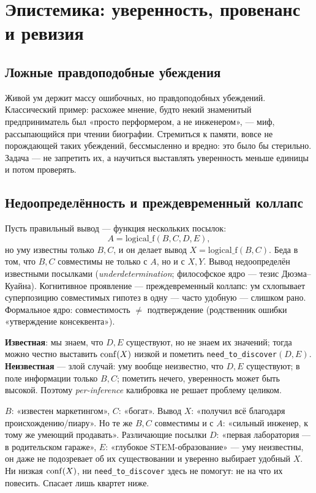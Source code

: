 \chapter{Эпистемика: уверенность, провенанс и ревизия}
\label{ch:epistemics}

\section{Ложные правдоподобные убеждения}

Живой ум держит массу ошибочных, но правдоподобных убеждений. Классический
пример: расхожее мнение, будто некий знаменитый предприниматель был «просто
перформером, а не инженером», --- миф, рассыпающийся при чтении биографии.
Стремиться к памяти, вовсе не порождающей таких убеждений, бессмысленно и
вредно: это было бы стерильно. Задача --- не запретить их, а научиться
выставлять уверенность меньше единицы и потом проверять.

\section{Недоопределённость и преждевременный коллапс}

Пусть правильный вывод --- функция нескольких посылок:
\[
A = \mathrm{logical\_f}(B, C, D, E),
\]
но уму известны только $B, C$, и он делает вывод
$X = \mathrm{logical\_f}(B, C)$. Беда в том, что $B, C$ совместимы не только с
$A$, но и с $X, Y$. Вывод недоопределён известными посылками
(\textit{underdetermination}; философское ядро --- тезис Дюэма--Куайна).
Когнитивное проявление --- преждевременный коллапс: ум схлопывает
суперпозицию совместимых гипотез в одну --- часто удобную --- слишком рано.
Формальное ядро: совместимость $\ne$ подтверждение (родственник ошибки
«утверждение консеквента»).

\begin{pitfall}
\textbf{Известная}: мы знаем, что $D, E$ существуют, но не знаем их значений;
тогда можно честно выставить $\mathrm{conf}(X)$ низкой и пометить
\texttt{need\_to\_discover}$(D, E)$. \textbf{Неизвестная} --- злой случай:
уму вообще неизвестно, что $D, E$ существуют; в поле информации только
$B, C$; пометить нечего, уверенность может быть высокой. Поэтому
\textit{per-inference} калибровка не решает проблему целиком.
\end{pitfall}

\begin{workedbox}
$B$: «известен маркетингом», $C$: «богат». Вывод $X$: «получил всё благодаря
происхождению/пиару». Но те же $B, C$ совместимы и с $A$: «сильный инженер, к
тому же умеющий продавать». Различающие посылки $D$: «первая лаборатория ---
в родительском гараже», $E$: «глубокое STEM-образование» --- уму неизвестны,
он даже не подозревает об их существовании и уверенно выбирает удобный $X$.
Ни низкая $\mathrm{conf}(X)$, ни \texttt{need\_to\_discover} здесь не помогут: не на
что их повесить. Спасает лишь квартет ниже.
\end{workedbox}

